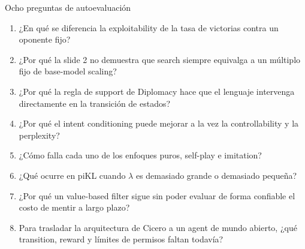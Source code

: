 \begin{importantbox}{Ocho preguntas de autoevaluación}
\begin{enumerate}
  \item ¿En qué se diferencia la exploitability de la tasa de victorias contra un oponente fijo?
  \item ¿Por qué la slide 2 no demuestra que search siempre equivalga a un múltiplo fijo de base-model scaling?
  \item ¿Por qué la regla de support de Diplomacy hace que el lenguaje intervenga directamente en la transición de estados?
  \item ¿Por qué el intent conditioning puede mejorar a la vez la controllability y la perplexity?
  \item ¿Cómo falla cada uno de los enfoques puros, self-play e imitation?
  \item ¿Qué ocurre en piKL cuando $\lambda$ es demasiado grande o demasiado pequeña?
  \item ¿Por qué un value-based filter sigue sin poder evaluar de forma confiable el costo de mentir a largo plazo?
  \item Para trasladar la arquitectura de Cicero a un agent de mundo abierto, ¿qué transition, reward y límites de permisos faltan todavía?
\end{enumerate}
\end{importantbox}



